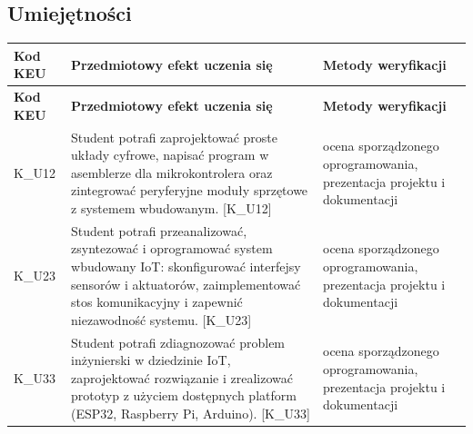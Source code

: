 \documentclass[12pt, a4paper]{article}
\newcommand{\thdrule}{\noalign{\global\setlength{\extrarowheight}{0pt}}}
\newcommand{\thdend}{\noalign{\global\setlength{\extrarowheight}{3pt}}}
\begin{document}
\subsection*{Umiejętności}
{\scriptsize
\begin{longtable}{m{1.6cm}m{9.0cm}m{4.2cm}}
\thdrule\toprule
\rowcolor{pjatkRed} {\color{white}\footnotesize\textbf{\vphantom{Ag}Kod KEU}} & {\color{white}\footnotesize\textbf{\vphantom{Ag}Przedmiotowy efekt uczenia się}} & {\color{white}\footnotesize\textbf{\vphantom{Ag}Metody weryfikacji}} \\
\midrule\thdend
\endfirsthead
\thdrule\toprule
\rowcolor{pjatkRed} {\color{white}\footnotesize\textbf{\vphantom{Ag}Kod KEU}} & {\color{white}\footnotesize\textbf{\vphantom{Ag}Przedmiotowy efekt uczenia się}} & {\color{white}\footnotesize\textbf{\vphantom{Ag}Metody weryfikacji}} \\
\midrule\thdend
\endhead
  \rowcolor{tableRowLight} K\_U12 & Student potrafi zaprojektować proste układy cyfrowe, napisać program w asemblerze dla mikrokontrolera oraz zintegrować peryferyjne moduły sprzętowe z systemem wbudowanym. {[}K\_U12{]} & ocena sporządzonego oprogramowania, prezentacja projektu i dokumentacji \\
  \rowcolor{tableRowAlt} K\_U23 & Student potrafi przeanalizować, zsyntezować i oprogramować system wbudowany IoT: skonfigurować interfejsy sensorów i aktuatorów, zaimplementować stos komunikacyjny i zapewnić niezawodność systemu. {[}K\_U23{]} & ocena sporządzonego oprogramowania, prezentacja projektu i dokumentacji \\
  \rowcolor{tableRowLight} K\_U33 & Student potrafi zdiagnozować problem inżynierski w dziedzinie IoT, zaprojektować rozwiązanie i zrealizować prototyp z użyciem dostępnych platform (ESP32, Raspberry Pi, Arduino). {[}K\_U33{]} & ocena sporządzonego oprogramowania, prezentacja projektu i dokumentacji \\
\bottomrule
\end{longtable}}
\end{document}
